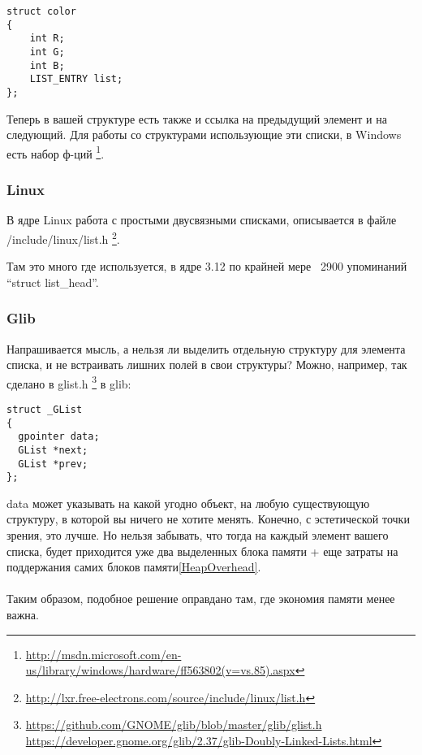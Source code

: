 \begin{lstlisting}
struct color
{
	int R;
	int G;
	int B;
	LIST_ENTRY list;
};
\end{lstlisting}

Теперь в вашей структуре есть также и ссылка на предыдущий элемент и на следующий.
Для работы со структурами использующие эти списки, в Windows есть набор ф-ций
\footnote{\url{http://msdn.microsoft.com/en-us/library/windows/hardware/ff563802(v=vs.85).aspx}}.

\subsubsection{Linux}

В ядре Linux работа с простыми двусвязными списками, описывается в файле /include/linux/list.h
\footnote{\url{http://lxr.free-electrons.com/source/include/linux/list.h}}.

Там это много где используется, в ядре 3.12 по крайней мере ~2900 упоминаний ``struct list\_head''.

\subsubsection{Glib}

Напрашивается мысль, а нельзя ли выделить отдельную структуру для элемента списка, и не встраивать лишних полей
в свои структуры? Можно, например, так сделано в glist.h
\footnote{\url{https://github.com/GNOME/glib/blob/master/glib/glist.h} 
\url{https://developer.gnome.org/glib/2.37/glib-Doubly-Linked-Lists.html}} в glib:

\begin{lstlisting}
struct _GList
{
  gpointer data;
  GList *next;
  GList *prev;
};
\end{lstlisting}

data может указывать на какой угодно объект, на любую существующую структуру, в которой вы ничего не хотите менять.
Конечно, с эстетической точки зрения, это лучше. Но нельзя забывать, что тогда на каждый элемент вашего списка,
будет приходится уже два выделенных блока памяти + 
еще затраты на поддержания самих блоков памяти\ref{HeapOverhead}. \\
\\
Таким образом, подобное решение оправдано там, где экономия памяти менее важна.

